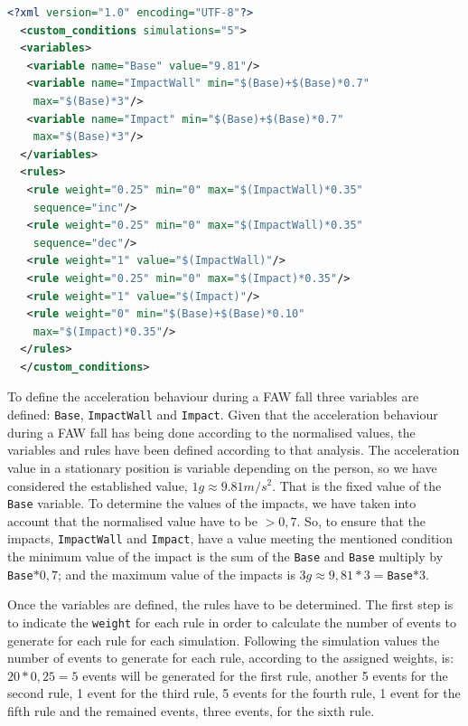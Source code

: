 \documentclass[review]{elsarticle}
\begin{document}
\begin{lstlisting}[basicstyle=\ttfamily\footnotesize,language=XML,caption={Rules to define a FAW fall},label=FAWFallRules]
  <?xml version="1.0" encoding="UTF-8"?>
  <custom_conditions simulations="5">
  <variables>
   <variable name="Base" value="9.81"/>
   <variable name="ImpactWall" min="$(Base)+$(Base)*0.7" 
    max="$(Base)*3"/>
   <variable name="Impact" min="$(Base)+$(Base)*0.7" 
    max="$(Base)*3"/>
  </variables>
  <rules>
   <rule weight="0.25" min="0" max="$(ImpactWall)*0.35" 
    sequence="inc"/>
   <rule weight="0.25" min="0" max="$(ImpactWall)*0.35" 
    sequence="dec"/>
   <rule weight="1" value="$(ImpactWall)"/>
   <rule weight="0.25" min="0" max="$(Impact)*0.35"/>
   <rule weight="1" value="$(Impact)"/>
   <rule weight="0" min="$(Base)+$(Base)*0.10"
    max="$(Impact)*0.35"/>
  </rules>
  </custom_conditions>
\end{lstlisting}

To define the acceleration behaviour during a FAW fall three variables are defined: \texttt{Base}, 
\texttt{ImpactWall} and \texttt{Impact}. Given that the acceleration behaviour during a FAW fall has
being done according to the normalised values, the variables and rules have been defined according to 
that analysis. The acceleration value in a stationary position is variable depending on the person, so 
we have considered the established value, $1g\approx9.81m/s^{2}$. That is the fixed value of the 
\texttt{Base} variable. To determine the values of the impacts, we have taken into account that the 
normalised value have to be $> 0,7$. So, to ensure that the impacts, \texttt{ImpactWall} and 
\texttt{Impact}, have a value meeting the mentioned condition the minimum value of the impact is the 
sum of the \texttt{Base} and \texttt{Base} multiply by \texttt{Base}$*0,7$; and the maximum value of the
impacts is $3g\approx9,81*3=$\texttt{Base}$*3$.

Once the variables are defined, the rules have to be determined. The first step is to indicate the 
\texttt{weight} for each rule in order to calculate the number of events to generate for each rule for 
each simulation. Following the simulation values the number of events to generate for each rule, according 
to the assigned weights, is: $20 * 0,25 = 5$ events will be generated for the first rule, another 5 events 
for the second rule, 1 event for the third rule, 5 events for the fourth rule, 1 event for the fifth
rule and the remained events, three events, for the sixth rule. 
\end{document}
